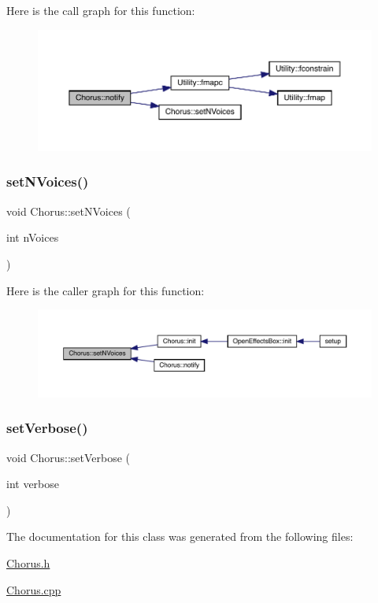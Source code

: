 Here is the call graph for this function\+:\nopagebreak
\begin{figure}[H]
\begin{center}
\leavevmode
\includegraphics[width=350pt]{class_chorus_acb22e9cc93011859d1ae02b05a7388f5_cgraph}
\end{center}
\end{figure}
\mbox{\label{class_chorus_adfe582e095779c9a658a9633bad8251b}} 
\subsubsection{\texorpdfstring{set\+N\+Voices()}{setNVoices()}}
{\footnotesize\ttfamily void Chorus\+::set\+N\+Voices (\begin{DoxyParamCaption}\item[{int}]{n\+Voices }\end{DoxyParamCaption})}

Here is the caller graph for this function\+:\nopagebreak
\begin{figure}[H]
\begin{center}
\leavevmode
\includegraphics[width=350pt]{class_chorus_adfe582e095779c9a658a9633bad8251b_icgraph}
\end{center}
\end{figure}
\mbox{\label{class_chorus_a26bc317aad64c5da7b643e57178b3e89}} 
\subsubsection{\texorpdfstring{set\+Verbose()}{setVerbose()}}
{\footnotesize\ttfamily void Chorus\+::set\+Verbose (\begin{DoxyParamCaption}\item[{int}]{verbose }\end{DoxyParamCaption})}



The documentation for this class was generated from the following files\+:\begin{DoxyCompactItemize}
\item 
\mbox{\hyperlink{_chorus_8h}{Chorus.\+h}}\item 
\mbox{\hyperlink{_chorus_8cpp}{Chorus.\+cpp}}\end{DoxyCompactItemize}

